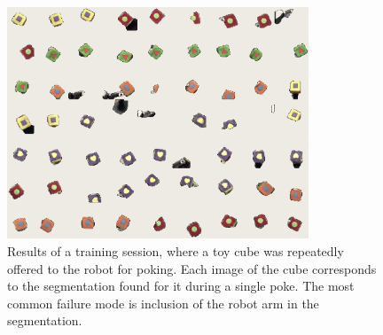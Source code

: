 \begin{figure}[tbh]
  \centerline{\includegraphics[width=9cm]{experiment-montage}}
  \caption{ 
  \label{fig:sample-results}
Results of a training session, where a toy cube was
  repeatedly offered to the robot for poking.  Each image of the cube
  corresponds to the segmentation found for it during a single poke.
  The most common failure mode is inclusion of the robot arm in the
  segmentation.  
}
\end{figure}

